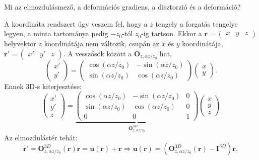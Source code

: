 \documentclass[12pt,a4paper]{scrartcl}
\let\mathbf\bm
\begin{document}
Mi az elmozdulásmező, a deformációs gradiens, a disztorzió és a deformáció?

A koordináta rendszert úgy veszem fel, hogy a $z$ tengely a forgatás tengelye legyen, a minta tartománya pedig $-z_0$-tól $z_0$-ig tartson. Ekkor a ${\mathbf{r}} = \left( {\begin{array}{*{20}{c}}
  x&y&z 
\end{array}} \right)$ helyvektor $z$ koordinátája nem változik, csupán az $x$ és $y$ koordinátája, ${\mathbf{r}}' = \left( {\begin{array}{*{20}{c}}
  {x'}&{y'}&z 
\end{array}} \right)$. A vesszősök között a ${{\mathbf{O}}_{z,\alpha z/{z_0}}}$ hat, 
\[\left( {\begin{array}{*{20}{c}}
  {x'} \\ 
  {y'} 
\end{array}} \right) = \left( {\begin{array}{*{20}{c}}
  {\cos \left( {\alpha z/{z_0}} \right)}&{ - \sin \left( {\alpha z/{z_0}} \right)} \\ 
  {\sin \left( {\alpha z/{z_0}} \right)}&{\cos \left( {\alpha z/{z_0}} \right)} 
\end{array}} \right)\left( {\begin{array}{*{20}{c}}
  x \\ 
  y 
\end{array}} \right).\]
Ennek 3D-s kiterjesztése:
\[\left( {\begin{array}{*{20}{c}}
  {x'} \\ 
  {y'} \\ 
  z 
\end{array}} \right) = \underbrace {\left( {\begin{array}{*{20}{c}}
  {\cos \left( {\alpha z/{z_0}} \right)}&{ - \sin \left( {\alpha z/{z_0}} \right)}&0 \\ 
  {\sin \left( {\alpha z/{z_0}} \right)}&{\cos \left( {\alpha z/{z_0}} \right)}&0 \\ 
  0&0&1 
\end{array}} \right)}_{{\mathbf{O}}_{z,\alpha z/{z_0}}^{3D}}\left( {\begin{array}{*{20}{c}}
  x \\ 
  y \\ 
  z 
\end{array}} \right)\]
Az elmozdulástér tehát:
\[{\mathbf{r}}' = {\mathbf{O}}_{z,\alpha z/{z_0}}^{3D}\left( {\mathbf{r}} \right){\mathbf{r}} = {\mathbf{u}}\left( {\mathbf{r}} \right) + {\mathbf{r}} \Rightarrow {\mathbf{u}}\left( {\mathbf{r}} \right) = \left( {{\mathbf{O}}_{z,\alpha z/{z_0}}^{3D}\left( {\mathbf{r}} \right) - {{\mathbf{I}}^{3D}}} \right){\mathbf{r}},\]
\end{document}
